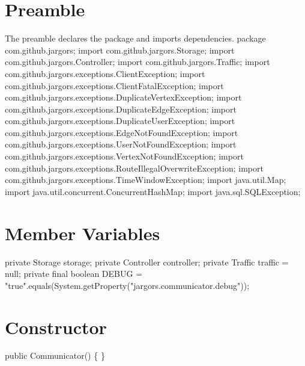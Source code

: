 \section{Preamble}
The preamble declares the package and imports dependencies.
\nwenddocs{}\endmoddef{}
package com.github.jargors;
\nwendcode{}\nwdocspar
\nwenddocs{}\plusendmoddef
import com.github.jargors.Storage;
import com.github.jargors.Controller;
import com.github.jargors.Traffic;
import com.github.jargors.exceptions.ClientException;
import com.github.jargors.exceptions.ClientFatalException;
import com.github.jargors.exceptions.DuplicateVertexException;
import com.github.jargors.exceptions.DuplicateEdgeException;
import com.github.jargors.exceptions.DuplicateUserException;
import com.github.jargors.exceptions.EdgeNotFoundException;
import com.github.jargors.exceptions.UserNotFoundException;
import com.github.jargors.exceptions.VertexNotFoundException;
import com.github.jargors.exceptions.RouteIllegalOverwriteException;
import com.github.jargors.exceptions.TimeWindowException;
import java.util.Map;
import java.util.concurrent.ConcurrentHashMap;
import java.sql.SQLException;
\nwendcode{}\nwdocspar

\section{Member Variables}
\nwenddocs{}\endmoddef{}
private Storage storage;
private Controller controller;
private Traffic traffic = null;
private final boolean DEBUG = "true".equals(System.getProperty("jargors.communicator.debug"));
\nwendcode{}\nwdocspar

\section{Constructor}
\nwenddocs{}\endmoddef{}
public Communicator() \{ \}
\nwendcode{}\nwdocspar

